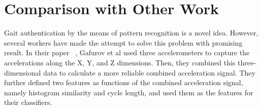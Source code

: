 \documentclass[10pt,twocolumn,letterpaper]{article}
\begin{document}
\section{Comparison with Other Work}
Gait authentication by the means of pattern recognition is a novel idea. However, several workers have made the attempt to solve this problem with promising result. In their paper ~\cite{Author03}, Gafurov et al used three accelerometers to capture the accelerations along the X, Y, and Z dimensions. Then, they combined this three-dimensional data to calculate a more reliable combined acceleration signal. They further defined two features as functions of the combined acceleration signal, namely histogram similarity and cycle length, and used them as the features for their classifiers.

{\small


}
\end{document}
